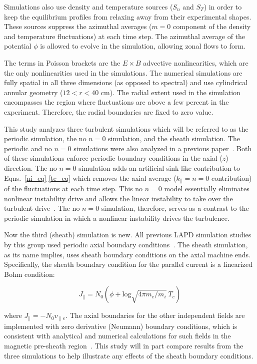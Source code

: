 \documentclass[showpacs,preprintnumbers,amsmath,amssymb,superscriptaddress,aip]{revtex4-1}
\def\beq{\begin{equation}}
\def\eeq{\end{equation}}
\def\para{\parallel}
\newcommand{\vpe}{v_{\parallel e}}
\begin{document}
Simulations also use density and temperature sources ($S_n$ and $S_T$) in order to keep the equilibrium profiles from relaxing away from their experimental shapes. 
These sources suppress the azimuthal averages ($m=0$ component of the density and temperature fluctuations) at each time step. 
The azimuthal average of the potential $\phi$ is allowed to evolve in
the simulation, allowing zonal flows to form.

The terms in Poisson brackets are the $E \times B$ advective nonlinearities, which are the only nonlinearities used in the simulations.
The numerical simulations are fully spatial in all three dimensions (as opposed to spectral) and use cylindrical annular geometry ($12<r<40$ cm). The radial extent used in the simulation
encompasses the region where fluctuations are above a few percent in the experiment. Therefore, the radial boundaries are fixed to zero value.

This study analyzes three turbulent simulations which will be referred to as the periodic simulation, the no $n=0$ simulation, and the sheath simulation.
The periodic and no $n=0$ simulations were also analyzed in a previous paper~\cite{friedman2012b}. Both of these simulations enforce periodic boundary conditions in the axial ($z$)
direction. The no $n=0$ simulation adds an artificial sink-like contribution to Eqns.~\ref{ni_eq}-\ref{te_eq} which removes the axial average 
($k_\parallel = n = 0$ contribution) of the fluctuations at each time step. This no $n=0$ model essentially eliminates nonlinear instability drive and allows
the linear instability to take over the turbulent drive~\cite{friedman2012b}. The no $n=0$ simulation, therefore, serves as a contrast to the periodic simulation in which a nonlinear instability
drives the turbulence.

Now the third (sheath) simulation is new. 
All previous LAPD simulation studies by this group used periodic axial boundary conditions~\cite{Popovich2010a,Popovich2010b,Umansky2011,friedman2012,friedman2012b}.
The sheath simulation, as its name implies, uses sheath boundary conditions on the axial machine ends. Specifically, the sheath boundary
condition for the parallel current is a linearized Bohm condition:

\beq
\label{sheath_bndry}
J_\para = N_0 (\phi + \text{log} \sqrt{4 \pi m_e/m_i} \ T_e) 
\eeq

where $J_\para = - N_0 \vpe$. The axial boundaries for the other independent fields are implemented with zero derivative (Neumann) boundary conditions, which is consistent with
analytical and numerical calculations for such fields in the magnetic pre-sheath region~\cite{loizu2012}. 
This study will in part compare results from the three simulations to help illustrate any effects of the sheath boundary conditions.
\end{document}
